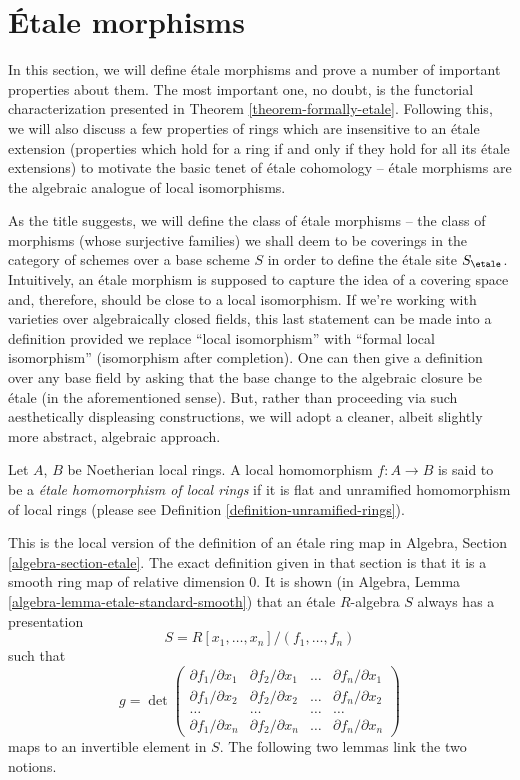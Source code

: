 \section{\'Etale morphisms}
\label{section-etale-morphisms}

\noindent
In this section, we will define \'etale morphisms and prove a number of
important properties about them. The most important one, no doubt, is the
functorial characterization presented in Theorem \ref{theorem-formally-etale}.
Following this, we will also discuss a few properties of rings which are
insensitive to an \'etale extension (properties which hold for a ring
if and only if they hold for all its \'etale extensions) to motivate the basic
tenet of \'etale cohomology -- \'etale morphisms are the algebraic analogue of
local isomorphisms.

\medskip\noindent
As the title suggests, we will define the class of \'etale morphisms -- the
class of morphisms (whose surjective families) we shall deem to be coverings
in the category of schemes over a base scheme $S$ in order to define the
\'etale site $S_\etale$. Intuitively, an \'etale morphism is supposed
to capture the idea of a covering space and, therefore, should be close to a
local isomorphism. If we're working with varieties over algebraically closed
fields, this last statement can be made into a definition provided we replace
``local isomorphism'' with ``formal local isomorphism'' (isomorphism after
completion). One can then give a definition over any base field by asking
that the base change to the algebraic closure be \'etale (in the
aforementioned sense). But, rather than proceeding via such aesthetically
displeasing constructions, we will adopt a cleaner, albeit slightly more
abstract, algebraic approach.

\begin{definition}
\label{definition-etale-ring}
Let $A$, $B$ be Noetherian local rings.
A local homomorphism $f : A \to B$ is said to be a
{\it \'etale homomorphism of local rings}
if it is flat and unramified homomorphism of local rings
(please see Definition \ref{definition-unramified-rings}).
\end{definition}

\noindent
This is the local version of the definition of an \'etale ring map in
Algebra, Section \ref{algebra-section-etale}.
The exact definition
given in that section is that it is a smooth ring map of relative
dimension $0$. It is shown (in
Algebra, Lemma \ref{algebra-lemma-etale-standard-smooth})
that an \'etale $R$-algebra $S$ always has a presentation
$$
S = R[x_1, \ldots, x_n]/(f_1, \ldots, f_n)
$$
such that
$$
g =
\det
\left(
\begin{matrix}
\partial f_1/\partial x_1 &
\partial f_2/\partial x_1 &
\ldots &
\partial f_n/\partial x_1 \\
\partial f_1/\partial x_2 &
\partial f_2/\partial x_2 &
\ldots &
\partial f_n/\partial x_2 \\
\ldots & \ldots & \ldots & \ldots \\
\partial f_1/\partial x_n &
\partial f_2/\partial x_n &
\ldots &
\partial f_n/\partial x_n
\end{matrix}
\right)
$$
maps to an invertible element in $S$. The following two lemmas link the two
notions.

